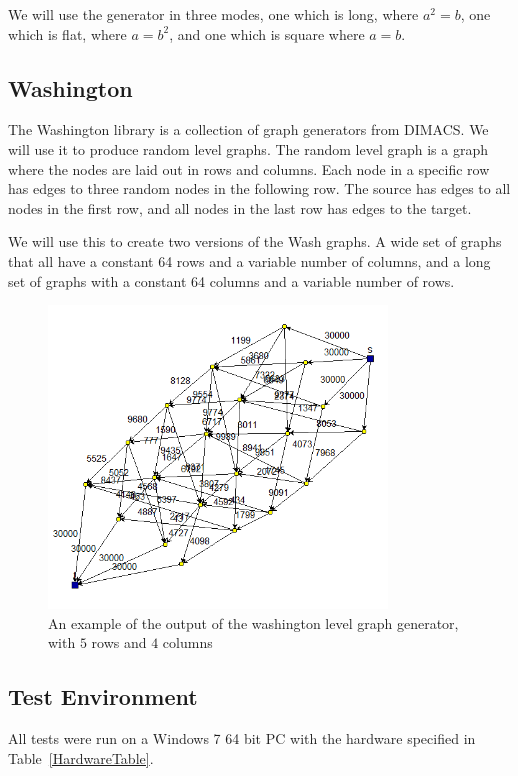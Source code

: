 We will use the generator in three modes, one which is long, where $a^2=b$, one which is flat, where $a = b^2$, and one which is square where $a=b$.


\subsection{Washington}
The Washington library is a collection of graph generators from DIMACS. We will use it to produce random level graphs.
The random level graph is a graph where the nodes are laid out in rows and columns. Each node in a specific row has edges to three random nodes in the following row.
The source has edges to all nodes in the first row, and all nodes in the last row has edges to the target.

We will use this to create two versions of the Wash graphs. A wide set of graphs that all have a constant 64 rows and a variable number of columns, and a long set of graphs with a constant 64 columns and a variable number of rows.


\begin{figure}[!ht]
\centering
\includegraphics[width=90mm]{wash.png}
\caption{An example of the output of the washington level graph generator, with $5$ rows and $4$ columns}
\label{washExample}
\end{figure}

\clearpage
\subsection{Test Environment}
All tests were run on a Windows 7 64 bit PC with the hardware specified in Table~\ref{HardwareTable}.\\

